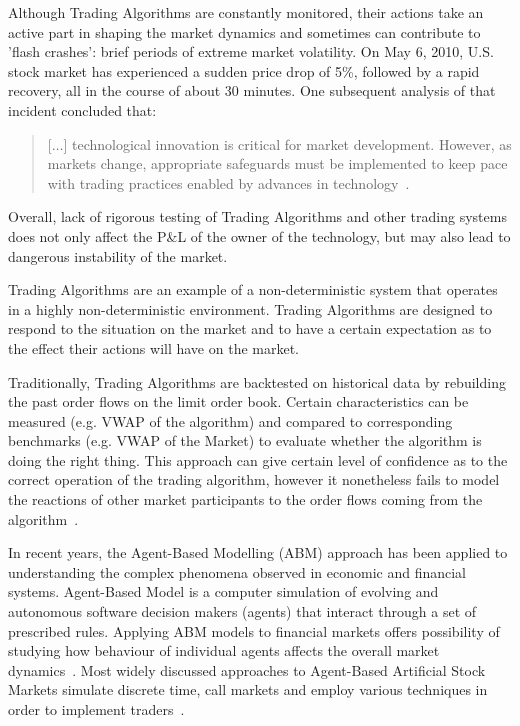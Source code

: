 Although Trading Algorithms are constantly monitored, their actions take an active part in shaping the market dynamics and sometimes can contribute to 'flash crashes': brief periods of extreme market volatility. On May 6, 2010, U.S. stock market has experienced a sudden price drop of 5\%, followed by a rapid recovery, all in the course of about 30 minutes. One subsequent analysis of that incident concluded that:
\begin{quote}
[$\ldots$] technological innovation is critical for market development. However, as markets change, appropriate safeguards must be implemented to keep pace with trading practices enabled by advances in technology~\cite{Kirilenko2011}.
\end{quote}
Overall, lack of rigorous testing of Trading Algorithms and other trading systems does not only affect the P\&L  of the owner of the technology, but may also lead to dangerous instability of the market.

Trading Algorithms are an example of a non-deterministic system that operates in a highly non-deterministic environment. Trading Algorithms are designed to respond to the situation on the market and to have a certain expectation as to the effect their actions will have on the market.

Traditionally, Trading Algorithms are backtested on historical data by rebuilding the past order flows on the limit order book. Certain characteristics can be measured (e.g. VWAP of the algorithm) and compared to corresponding benchmarks (e.g. VWAP of the Market) to evaluate whether the algorithm is doing the right thing. This approach can give certain level of confidence as to the correct operation of the trading algorithm, however it nonetheless fails to model the reactions of other market participants to the order flows coming from the algorithm~\cite{Coggins2006}.

In recent years, the Agent-Based Modelling (ABM) approach has been applied to understanding the complex phenomena observed in economic and financial systems. Agent-Based Model is a computer simulation of evolving and autonomous software decision makers (agents) that interact through a set of prescribed rules. Applying ABM models to financial markets offers possibility of studying how behaviour of individual agents affects the overall market dynamics~\cite{Sorban2008}\cite{Farmer2009}. Most widely discussed approaches to Agent-Based Artificial Stock Markets simulate discrete time, call markets and employ various techniques in order to implement traders~\cite{Jha2010}.

